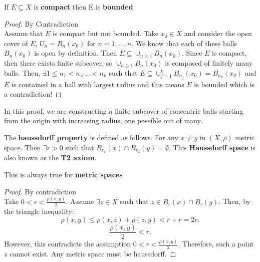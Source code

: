 \documentclass[a4paper]{article}
\begin{document}
\begin{prop}
  If $E \subseteq X$ is \textbf{compact} then E is \textbf{bounded}
  \begin{proof}{By Contradiction}\\
    Assume that $E$ is compact but not bounded.  Take $x_0 \in X$ and consider the open cover of $E$,  $U_n = B_n(x_0)$ 
    for $n=1,\ldots,n$. We know that each of these balls $B_n(x_0)$ is open by definition. Then $E \subseteq \cup_{n \geq 1} B_n(x_0)$.
    Since $E$ is compact, then there exists finite subcover, so $\cup_{n \geq 1} B_n(x_0)$ is composed of finitely many balls.
    Then, $\exists 1 \leq n_1 < n_< \ldots < n_k$ such that $E \subseteq \cup_{j=1}^k B_{n_j}(x_0) = B_{n_k} (x_0)$ 
    and $E$ is contained in a ball with largest radius and this means $E$ is bounded which is a contradiction!  \end{proof}
\end{prop}
\begin{note} 
    In this proof, we are constructing a finite subcover of concentric balls starting from the origin with increasing radius,
    one possible out of many.
\end{note}

\begin{definition}
  The \textbf{haussdorff property} is defined as follows. For any $x \neq y$ in  $\left( X, \rho \right) $ metric space.
  Then $\exists r>0$ such that $B_{r_1}(x) \cap B_{r_2}(y) = \emptyset$. This \textbf{Haussdorff space} is also known
  as the \textbf{T2 axiom}.
\end{definition}
\begin{note}
  This is always true for \textbf{metric spaces}

  \begin{proof}{By contradiction} \\
    Take $0 < r < \frac{\rho(x,y)}{2}$. Assume $\exists z \in X$ such that $z \in B_r(x) \cap B_r(y)$.  Then,
    by the triangle inequality:
    \[
    \rho(x,y) \leq \rho(x,z) + \rho(z,y) < r + r = 2r 
    .\] 
    \[
    \frac{\rho(x,y)}{2} < r
    .\] 
    However, this contradicts the assumption $0 < r < \frac{\rho(x,y)}{2}$. Therefore, such a point $z$ 
    cannot exist. Any metric space must be haussdorff.
  \end{proof}
\end{note}
\end{document}
